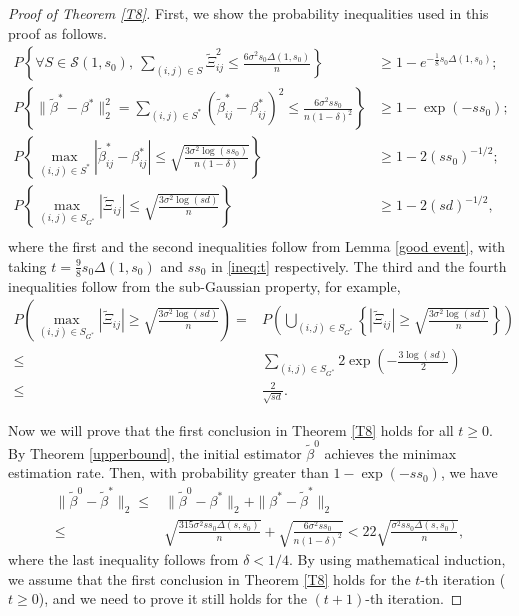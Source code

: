\documentclass[12pt]{article}
\newtheorem{proof}{Proof}
\begin{document}
\begin{appendix}
\begin{proof}[Proof of Theorem \ref{T8}]
First, we show the probability inequalities used in this proof as follows.
\begin{equation}\label{eq:exactprob}
\begin{aligned}
P\left\{ \forall S \in \mathcal S(1,s_0),~\sum_{(i,j) \in S}\tilde \Xi_{ij}^2 
  \le \frac{6\sigma^2 s_0 \Delta(1,s_0)}{n} \right\} &\ge 1- e^{ -\frac18 s_0 \Delta(1,s_0) };\\
P\left\{ \|\tilde\beta^* - \beta^*\|_2^2 = \sum_{(i,j) \in S^*}\left( \tilde\beta_{ij}^* - \beta_{ij}^* \right)^2 \le \frac{6\sigma^2 ss_0}{n(1-\delta)^2} \right\} &\ge 1- \exp\left( -ss_0 \right);\\
P\left\{ \max_{(i,j) \in S^*} |\tilde\beta_{ij}^* - \beta^*_{ij}| 
  \le \sqrt{\frac{3\sigma^2 \log(ss_0)}{n(1-\delta)}}\right\} &\ge 1- 2 (ss_0)^{-1/2}; \\
P\left\{ \max_{(i,j) \in S_{G^*}} |\tilde\Xi_{ij}| 
  \le \sqrt{\frac{3\sigma^2 \log(sd)}{n }}\right\} & \ge 1- 2 (sd)^{-1/2}, \\
\end{aligned}
\end{equation}
where the first and the second inequalities follow from Lemma \ref{good event}, with taking $t=\frac98 s_0 \Delta(1,s_0) $ and $ss_0$ in \eqref{ineq:t} respectively. 
The third and the fourth inequalities follow from the sub-Gaussian property, for example,
\begin{align*}
P\left( \max_{(i,j) \in S_{G^*}} |\tilde\Xi_{ij}| \ge \sqrt{\frac{3\sigma^2 \log(sd)}{n }}\right)
= & P\left( \bigcup_{(i,j) \in S_{G^*}} \left\{ |\tilde\Xi_{ij}| \ge \sqrt{\frac{3\sigma^2 \log(sd)}{n}} \right\}\right)\\
\le & \sum_{(i,j) \in S_{G^*}}2 \exp\left(-\frac{3\log(sd)}{2} \right)\\
\le & \frac{2}{\sqrt{sd}}.
\end{align*}


Now we will prove that the first conclusion in Theorem \ref{T8} holds for all $t \ge 0$. %
By Theorem \ref{upperbound}, the initial estimator $\tilde \beta^0$ achieves the minimax estimation rate.
Then, with probability greater than $1-\exp(-ss_0)$, we have 
\begin{equation*}
\begin{aligned}
    \| \tilde \beta^0 -\tilde \beta^* \|_2
\le& \| \tilde \beta^0 - \beta^* \|_2 + \| \beta^*-\tilde \beta^* \|_2\\
\le& \sqrt{ \frac{315\sigma^2 ss_0 \Delta(s,s_0)}{n} } + \sqrt{\frac{6\sigma^2 ss_0}{n(1-\delta)^2} }
< 22\sqrt{ \frac{ \sigma^2 ss_0 \Delta(s,s_0)}{n} } ,
\end{aligned}
\end{equation*}
where the last inequality follows from $\delta < 1/4$. 
By using mathematical induction, we assume that the first conclusion in Theorem \ref{T8} holds for the $t$-th iteration ($t\ge 0$), and we need to prove it still holds for the $(t+1)$-th iteration.


\end{proof}
\end{appendix}
\end{document}
